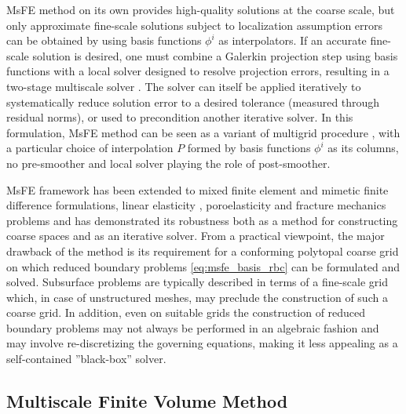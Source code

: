 MsFE method on its own provides high-quality solutions at the coarse scale, but only approximate fine-scale solutions subject to localization assumption errors can be obtained by using basis functions $\phi^i$ as interpolators.   If an accurate fine-scale solution is desired, one must combine a Galerkin projection step using basis functions with a local solver designed to resolve projection errors, resulting in a two-stage multiscale solver \cite{Zhou2012}.   The solver can itself be applied iteratively to systematically reduce solution error to a desired tolerance (measured through residual norms), or used to precondition another iterative solver.   In this formulation, MsFE method can be seen as a variant of multigrid procedure , with a particular choice of interpolation $P$ formed by basis functions $\phi^i$ as its columns, no pre-smoother and local solver playing the role of post-smoother.

MsFE framework has been extended to mixed finite element \cite{Chen2002} and mimetic finite difference \cite{Lipnikov2008} formulations, linear elasticity \cite{Buck2013,Castelletto2017}, poroelasticity \cite{Brown2016,Castelletto2019} and fracture mechanics \cite{Levonyan2019} problems and has demonstrated its robustness both as a method for constructing coarse spaces and as an iterative solver.   From a practical viewpoint, the major drawback of the method is its requirement for a conforming polytopal coarse grid on which reduced boundary problems \cref{eq:msfe_basis_rbc} can be formulated and solved.   Subsurface problems are typically described in terms of a fine-scale grid which, in case of unstructured meshes, may preclude the construction of such a coarse grid.   In addition, even on suitable grids the construction of reduced boundary problems may not always be performed in an algebraic fashion and may involve re-discretizing the governing equations, making it less appealing as a self-contained ''black-box'' solver.

\subsection{Multiscale Finite Volume Method}
\label{subsec:related_work_msfv}


